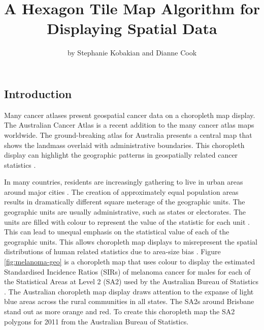 \title{A Hexagon Tile Map Algorithm for Displaying Spatial Data}
\author{by Stephanie Kobakian and Dianne Cook}

\maketitle


\hypertarget{introduction}{%
\subsection{Introduction}\label{introduction}}

Many cancer atlases present geospatial cancer data on a choropleth map
display. The Australian Cancer Atlas \citep{TACA} is a recent addition
to the many cancer atlas maps worldwide. The ground-breaking atlas for
Australia presents a central map that shows the landmass overlaid with
administrative boundaries. This choropleth display can highlight the
geographic patterns in geospatially related cancer statistics
\citep{SAMGIS}.

In many countries, residents are increasingly gathering to live in urban
areas around major cities \citep{ACTUC}. The creation of approximately
equal population areas results in dramatically different square meterage
of the geographic units. The geographic units are usually
administrative, such as states or electorates. The units are filled with
colour to represent the value of the statistic for each unit \citep{EI}.
This can lead to unequal emphasis on the statistical value of each of
the geographic units. This allows choropleth map displays to
misrepresent the spatial distributions of human related statistics due
to area-size bias \citep{BCM}. Figure \ref{fig:melanoma-geo} is a
choropleth map that uses colour to display the estimated Standardised
Incidence Ratios (SIRs) of melanoma cancer for males for each of the
Statistical Areas at Level 2 (SA2) used by the Australian Bureau of
Statistics \citeyearpar{abs2011}. The Australian choropleth map display
draws attention to the expanse of light blue areas across the rural
communities in all states. The SA2s around Brisbane stand out as more
orange and red. To create this choropleth map the SA2 polygons for 2011
from the Australian Bureau of Statistics.

